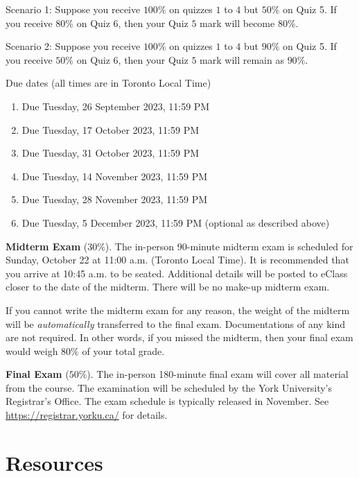 \documentclass[./main.tex]{subfiles}
\begin{document}
Scenario 1: Suppose you receive \(100 \%\) on quizzes \(1\) to \(4\) but \(50 \%\) on Quiz 5. If you receive \(80\%\) on Quiz 6, then your Quiz \(5\) mark will become \(80\%\).

Scenario 2: Suppose you receive \(100 \%\) on quizzes \(1\) to \(4\) but \(90 \%\) on Quiz 5. If you receive \(50\%\) on Quiz 6, then your Quiz \(5\) mark will remain as \(90\%\).

Due dates (all times are in Toronto Local Time)
\begin{enumerate}[label={Quiz \arabic* -}, align=left]
\item Due Tuesday, 26 September 2023, 11:59 PM
\item Due Tuesday, 17 October 2023, 11:59 PM
\item Due Tuesday, 31 October 2023, 11:59 PM
\item Due Tuesday, 14 November 2023, 11:59 PM
\item Due Tuesday, 28 November 2023, 11:59 PM
\item Due Tuesday, 5 December 2023, 11:59 PM (optional as described above)
\end{enumerate}

\textbf{Midterm Exam} (\(30 \%\)). The in-person 90-minute midterm exam is scheduled for Sunday, October 22 at 11:00 a.m. (Toronto Local Time). It is recommended that you arrive at 10:45 a.m. to be seated. Additional details will be posted to eClass closer to the date of the midterm. There will be no make-up midterm exam.

If you cannot write the midterm exam for any reason, the weight of the midterm will be \emph{automatically} transferred to the final exam. Documentations of any kind are not required. In other words, if you missed the midterm, then your final exam would weigh \(80 \%\) of your total grade. 

\textbf{Final Exam} (\(50 \%\)). The in-person 180-minute final exam will cover all material from the course. The examination will be scheduled by the York University's Registrar's Office. The exam schedule is typically released in November. See \url{https://registrar.yorku.ca/} for details.

\section*{Resources}
\end{document}

